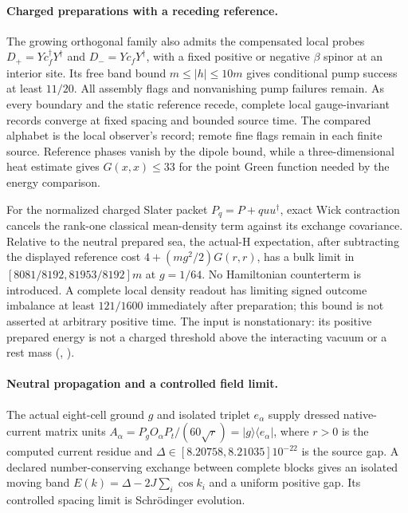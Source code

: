 \paragraph{Charged preparations with a receding reference.}
The growing orthogonal family also admits the compensated local probes
$D_+=Yc_f^\dagger Y^\dagger$ and $D_-=Yc_fY^\dagger$, with a fixed
positive or negative $\beta$ spinor at an interior site. Its free band
bound $m\le |h|\le10m$ gives conditional pump success at least $11/20$.
All assembly flags and nonvanishing pump failures remain. As every
boundary and the static reference recede, complete local gauge-invariant
records converge at fixed spacing and bounded source time. The compared
alphabet is the local observer's record; remote fine flags remain in each
finite source. Reference phases vanish by the dipole bound, while a
three-dimensional heat estimate gives $G(x,x)\le33$ for the point Green
function needed by the energy comparison.

For the normalized charged Slater packet $P_q=P+q uu^\dagger$, exact
Wick contraction cancels the rank-one classical mean-density term
against its exchange covariance. Relative to the neutral prepared sea,
the actual-H expectation, after subtracting the displayed reference cost
$4+(mg^2/2)G(r,r)$, has a bulk limit in
$[8081/8192,81953/8192]m$ at $g=1/64$. No Hamiltonian counterterm is
introduced. A complete local density readout has limiting signed outcome
imbalance at least $121/1600$ immediately after preparation; this bound
is not asserted at arbitrary positive time. The input is nonstationary:
its positive prepared energy is not a charged threshold above the
interacting vacuum or a rest mass
(, \cite{ophrepo}).

\paragraph{Neutral propagation and a controlled field limit.}
The actual eight-cell ground $g$ and isolated triplet $e_\alpha$ supply
dressed native-current matrix units
$A_\alpha=P_gO_\alpha P_t/(60\sqrt r)=|g\rangle\langle e_\alpha|$,
where $r>0$ is the computed current residue and
$\Delta\in[8.20758,8.21035]10^{-22}$ is the source gap.
A declared number-conserving exchange between complete blocks gives
an isolated moving band
$E(k)=\Delta-2J\sum_i\cos k_i$ and a uniform positive gap.
Its controlled spacing limit is Schr\"odinger evolution.

